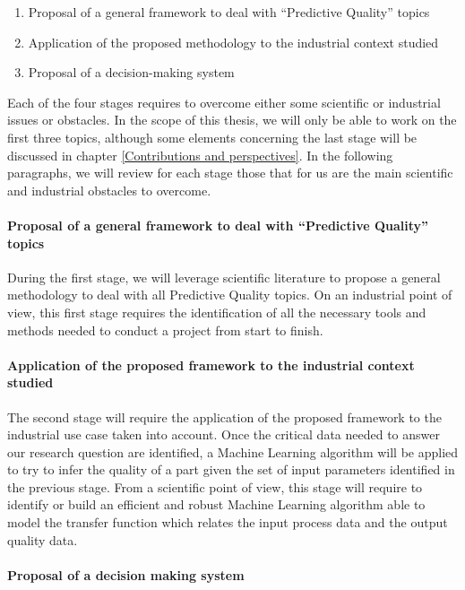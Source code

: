 \begin{enumerate}
    \item Proposal of a general framework to deal with ``Predictive Quality'' topics 
    \item Application of the proposed methodology to the industrial context studied
    \item Proposal of a decision-making system 
\end{enumerate}

Each of the four stages requires to overcome either some scientific or industrial issues or obstacles. In the scope of this thesis, we will only be able to work on the first three topics, although some elements concerning the last stage will be discussed in chapter \ref{Contributions and perspectives}. In the following paragraphs, we will review for each stage those that for us are the main scientific and industrial obstacles to overcome.

\paragraph{Proposal of a general framework to deal with ``Predictive Quality'' topics}

During the first stage, we will leverage scientific literature to propose a general methodology to deal with all Predictive Quality topics. On an industrial point of view, this first stage requires the identification of all the necessary tools and methods needed to conduct a project from start to finish.

\paragraph{Application of the proposed framework to the industrial context studied}

The second stage will require the application of the proposed framework to the industrial use case taken into account. Once the critical data needed to answer our research question are identified, a Machine Learning algorithm will be applied to try to infer the quality of a part given the set of input parameters identified in the previous stage. From a scientific point of view, this stage will require to identify or build an efficient and robust Machine Learning algorithm able to model the transfer function which relates the input process data and the output quality data. 

\paragraph{Proposal of a decision making system}


